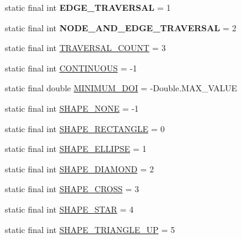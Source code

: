 \begin{DoxyCompactItemize}
\item 
\hypertarget{interfaceprefuse_1_1_constants_abebb044cfeac70bc26356130466ed0c0}{static final int {\bfseries \-E\-D\-G\-E\-\_\-\-T\-R\-A\-V\-E\-R\-S\-A\-L} = 1}\label{interfaceprefuse_1_1_constants_abebb044cfeac70bc26356130466ed0c0}

\item 
\hypertarget{interfaceprefuse_1_1_constants_afb45d4eafc9095ced746fe678ec17f13}{static final int {\bfseries \-N\-O\-D\-E\-\_\-\-A\-N\-D\-\_\-\-E\-D\-G\-E\-\_\-\-T\-R\-A\-V\-E\-R\-S\-A\-L} = 2}\label{interfaceprefuse_1_1_constants_afb45d4eafc9095ced746fe678ec17f13}

\item 
static final int \hyperlink{interfaceprefuse_1_1_constants_ae5a466e1c5736af1fef4f295af39273f}{\-T\-R\-A\-V\-E\-R\-S\-A\-L\-\_\-\-C\-O\-U\-N\-T} = 3
\item 
static final int \hyperlink{interfaceprefuse_1_1_constants_af339eb83e76041e60cbed2191a8880af}{\-C\-O\-N\-T\-I\-N\-U\-O\-U\-S} = -\/1
\item 
static final double \hyperlink{interfaceprefuse_1_1_constants_aba9f6777a5d4c6666073b4280e7fc8d8}{\-M\-I\-N\-I\-M\-U\-M\-\_\-\-D\-O\-I} = -\/\-Double.\-M\-A\-X\-\_\-\-V\-A\-L\-U\-E
\item 
static final int \hyperlink{interfaceprefuse_1_1_constants_ac2654600d5b17de95e333c1a311e498a}{\-S\-H\-A\-P\-E\-\_\-\-N\-O\-N\-E} = -\/1
\item 
static final int \hyperlink{interfaceprefuse_1_1_constants_a8a7f76b02d7539cafc7e79d7447e0dc3}{\-S\-H\-A\-P\-E\-\_\-\-R\-E\-C\-T\-A\-N\-G\-L\-E} = 0
\item 
static final int \hyperlink{interfaceprefuse_1_1_constants_a3f315c282b50ee4f85fc48c02cb65b65}{\-S\-H\-A\-P\-E\-\_\-\-E\-L\-L\-I\-P\-S\-E} = 1
\item 
static final int \hyperlink{interfaceprefuse_1_1_constants_aaf1203d813d71d98b36a1fe11cb5b9e2}{\-S\-H\-A\-P\-E\-\_\-\-D\-I\-A\-M\-O\-N\-D} = 2
\item 
static final int \hyperlink{interfaceprefuse_1_1_constants_a8630b547a7e4eb46d3d9a75247944afb}{\-S\-H\-A\-P\-E\-\_\-\-C\-R\-O\-S\-S} = 3
\item 
static final int \hyperlink{interfaceprefuse_1_1_constants_a1ac6f54ddd18c2c444b5251c39266acc}{\-S\-H\-A\-P\-E\-\_\-\-S\-T\-A\-R} = 4
\item 
static final int \hyperlink{interfaceprefuse_1_1_constants_a7ead8af57c70ad295075f7bf0339e0b8}{\-S\-H\-A\-P\-E\-\_\-\-T\-R\-I\-A\-N\-G\-L\-E\-\_\-\-U\-P} = 5
\item 

\end{DoxyCompactItemize}
